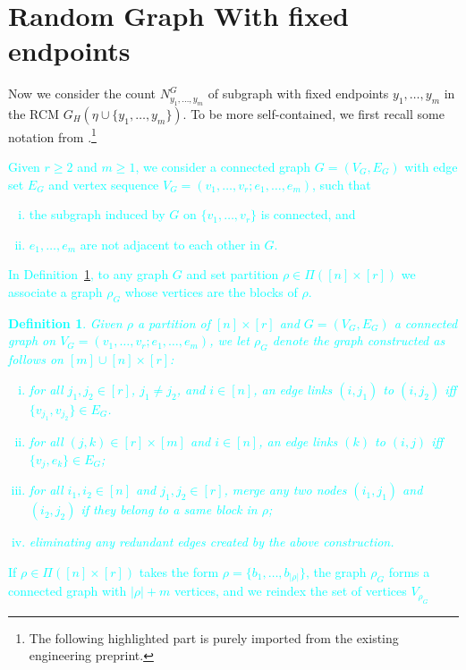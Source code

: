 \documentclass[12pt]{article}
\newtheorem{definition}[prop]{Definition}
\numberwithin{equation}{section}
\begin{document}
\section{Random Graph With fixed endpoints}
\noindent
Now we consider the count $N^G_{y_1,\dots,y_m}$ of subgraph with fixed endpoints $y_1,\dots,y_m$ in the RCM $G_H(\eta\cup\{y_1,\dots,y_m\})$. To be more self-contained, we first recall some notation from \cite{LiuPrivault2}.\footnote{The following highlighted part is purely imported from the existing engineering preprint.}
\textcolor{cyan}{
Given $r\geq 2$ and $m\geq 1$, we 
consider a connected graph $G=(V_G,E_G)$ with edge set $E_G$ and
vertex sequence 
$V_G=(v_1, \ldots ,v_r; e_1,\ldots , e_m)$, such that
\begin{enumerate}[i)]
\item the subgraph induced by $G$ on $\{v_1, \ldots ,v_r\}$ is connected, and 
\item $e_1, \ldots ,e_m$ are not adjacent to each other in $G$. 
\end{enumerate}
In Definition~\ref{defgraph1},
 to any graph $G$ and set partition $\rho\in\Pi ([n]\times[r])$
we associate a graph $\rho_G$ whose vertices are the blocks of $\rho$.
\begin{definition}
  \label{defgraph1}
  Given $\rho$ a partition of $[n]\times[r]$
  and $G=(V_G,E_G)$ a connected graph 
  on $V_G=(v_1, \ldots ,v_r; e_1,\ldots , e_m)$, 
  we let $\rho_G$ denote the graph 
  constructed as follows on $[m] \cup [n]\times [r]$:
\begin{enumerate}[i)]  
\item for all $j_1, j_2\in [r]$, $j_1\not= j_2$, and $i\in [n]$, 
 an edge links $(i,j_1)$ to $(i,j_2)$
 iff $\{v_{j_1},v_{j_2}\}\in E_G$. 
\item for all $(j,k)\in [r]\times [m]$ and $i\in [n]$, an edge
 links $(k)$ to $(i,j)$ iff $\{v_j,e_k\}\in E_G$; 
\item for all $i_1,i_2\in [n]$
 and $j_1,j_2\in [r]$,
 merge any two nodes $(i_1,j_1)$ and $(i_2,j_2)$ 
 if they belong to a same block in $\rho$;  
\item eliminating any redundant edges created by the above construction.
\end{enumerate}
\end{definition}
\noindent
If $\rho\in\Pi ([n]\times[r])$
takes the form $\rho = \{ b_1,\ldots , b_{|\rho |}\}$, 
the graph $\rho_G$ forms a connected graph with
$|\rho | + m$ vertices, and we reindex the set of vertices $V_{\rho_G}$
}
\end{document}
